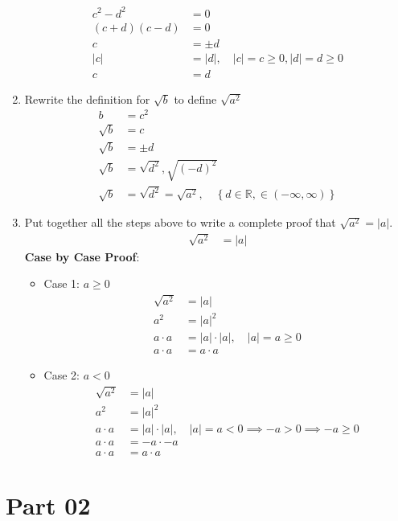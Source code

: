 \documentclass{article}
\begin{document}
\begin{enumerate}[label = \textbf{\alph*)}]
\begin{align*}
			c^2 - d^2 & = 0 \\
			(c + d)(c - d) & = 0 \\
			c & = \pm d \\
			|c| & = |d|, \quad |c| = c \geq 0, |d| = d \geq 0 \\
			c & = d
		\end{align*}
	\item Rewrite the definition for $ \sqrt{b} $ to define $ \sqrt{ a^2 } $
		\begin{align*}
			b & = c^2 \\
			\sqrt{b} & = c \\
			\sqrt{b} & = \pm d \\
			\sqrt{b} & = \sqrt{ d^2 }, \sqrt{ (-d)^2 } \\
			\sqrt{b} & = \sqrt{ d^2 } = \sqrt{ a^2 }, \quad \left\{ d \in \mathbb{R}, \in (-\infty, \infty) \right\}
		\end{align*}
	\item Put together all the steps above to write a complete proof that $ \sqrt{ a^2 } = |a| $.
		\begin{align*}
			\sqrt{ a^2 } & = |a|
		\end{align*}
		\textbf{Case by Case Proof}:
		\begin{itemize}
			\item Case 1: $ a \geq 0 $
				\begin{align*}
					\sqrt{ a^2 } & = |a| \\
					a^2 & = |a|^2 \\
					a \cdot a & = |a| \cdot |a|, \quad |a| = a \geq 0 \\
					a \cdot a & = a \cdot a
				\end{align*}
			\item Case 2: $ a < 0 $
				\begin{align*}
					\sqrt{ a^2 } & = |a| \\
					a^2 & = |a|^2 \\
					a \cdot a & = |a| \cdot |a|, \quad |a| = a < 0 \implies -a > 0 \implies -a \geq 0 \\
					a \cdot a & = -a \cdot -a \\
					a \cdot a & = a \cdot a
				\end{align*}
		\end{itemize}
\end{enumerate}

\section{Part 02}
\end{document}
